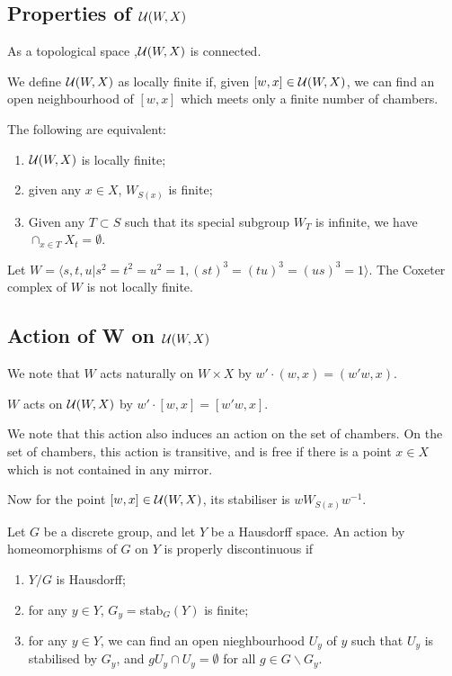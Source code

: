 \documentclass[11pt]{article}
\begin{document}
\subsection{Properties of $\mathcal{U}(W,X)$}
\begin{lemma}
    As a topological space ,$\mathcal{U}(W,X)$ is connected.
\end{lemma}

\begin{definition}
    We define  $\mathcal{U}(W,X)$ as locally finite if, given $[w,x]\in\mathcal{U}(W,X)$, we can find an open neighbourhood of $[w,x]$ which meets only a finite number of chambers.
\end{definition}

\begin{lemma}
    The following are equivalent:
    \begin{enumerate}
        \item $\mathcal{U}(W,X)$ is locally finite;
        \item given any $x\in X$, $W_{S(x)}$ is finite;
        \item Given any $T\subset S$ such that its special subgroup $W_T$ is infinite, we have $\cap_{x\in T}X_t=\emptyset.$
    \end{enumerate}
\end{lemma}

\begin{example}
    Let $W=\langle s,t,u|s^2=t^2=u^2=1,(st)^3=(tu)^3=(us)^3=1\rangle$. The Coxeter complex of $W$ is not locally finite. 
\end{example}


\subsection{Action of W on $\mathcal{U}(W,X)$}

We note that $W$ acts naturally on $W\times X$ by $w'\cdot(w,x)=(w'w,x)$. 

\begin{lemma}
    $W$ acts on $\mathcal{U}(W,X)$ by $w'\cdot[w,x]=[w'w,x].$
\end{lemma}

We note that this action also induces an action on the set of chambers. On the set of chambers, this action is transitive, and is free if there is a point $x\in X$ which is not contained in any mirror. 

Now for the point $[w,x]\in\mathcal{U}(W,X)$, its stabiliser is $wW_{S(x)}w^{-1}$. 

\begin{definition}
    Let $G$ be a discrete group, and let $Y$ be a Hausdorff space. An action by homeomorphisms of $G$ on $Y$ is properly discontinuous if 
    \begin{enumerate}
        \item $Y/G$ is Hausdorff;
        \item for any $y\in Y$, $G_y=$stab$_G(Y)$ is finite;
        \item for any $y\in Y$, we can find an open nieghbourhood $U_y$ of $y$ such that $U_y$ is stabilised by $G_y$, and $gU_y\cap U_y=\emptyset$ for all $g\in G\backslash G_y$. 
    \end{enumerate}
\end{definition}
\end{document}
